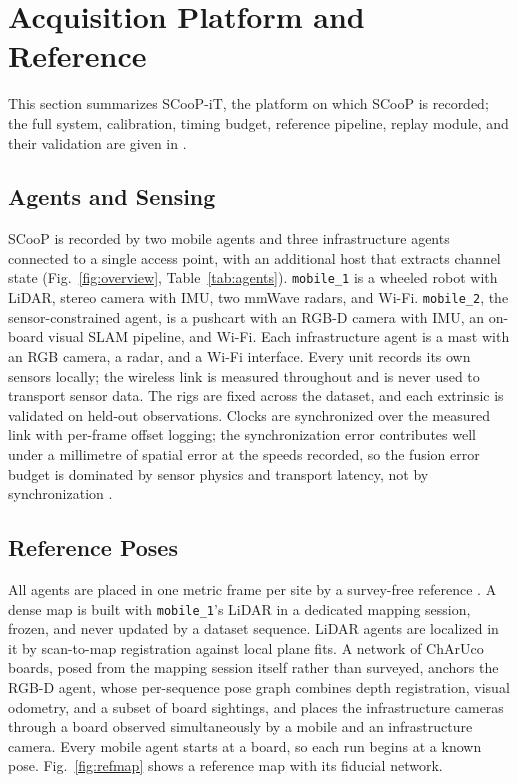 \documentclass[journal]{IEEEtran}
\begin{document}
\section{Acquisition Platform and Reference}
\label{sec:platform}
This section summarizes SCooP-iT, the platform on which SCooP is
recorded; the full system, calibration, timing budget, reference
pipeline, replay module, and their validation are given in
\cite{scoop_testbed}.

\subsection{Agents and Sensing}
SCooP is recorded by two mobile agents and three infrastructure
agents connected to a single access point, with an additional host
that extracts channel state (Fig.~\ref{fig:overview},
Table~\ref{tab:agents}). \texttt{mobile\_1} is a wheeled robot with
LiDAR, stereo camera with IMU, two mmWave radars, and Wi-Fi.
\texttt{mobile\_2}, the sensor-constrained agent, is a pushcart with
an RGB-D camera with IMU, an on-board visual SLAM pipeline, and Wi-Fi.
Each infrastructure agent is a mast with an RGB camera, a radar, and a
Wi-Fi interface. Every unit records its own sensors locally; the
wireless link is measured throughout and is never used to transport
sensor data. The rigs are fixed across the dataset, and each extrinsic
is validated on held-out observations. Clocks are synchronized over
the measured link with per-frame offset logging; the synchronization
error contributes well under a millimetre of spatial error at the
speeds recorded, so the fusion error budget is dominated by sensor
physics and transport latency, not by synchronization
\cite{scoop_testbed}.





\subsection{Reference Poses}
\label{sec:gt}
All agents are placed in one metric frame per site by a survey-free
reference \cite{scoop_testbed}. A dense map is built with
\texttt{mobile\_1}'s LiDAR in a dedicated mapping session, frozen, and
never updated by a dataset sequence. LiDAR agents are localized in it
by scan-to-map registration against local plane fits. A network of
ChArUco boards, posed from the mapping session itself rather than
surveyed, anchors the RGB-D agent, whose per-sequence pose graph
combines depth registration, visual odometry, and a subset of board
sightings, and places the infrastructure cameras through a board
observed simultaneously by a mobile and an infrastructure camera.
Every mobile agent starts at a board, so each run begins at a known
pose. Fig.~\ref{fig:refmap} shows a reference map with its fiducial
network.
\end{document}
